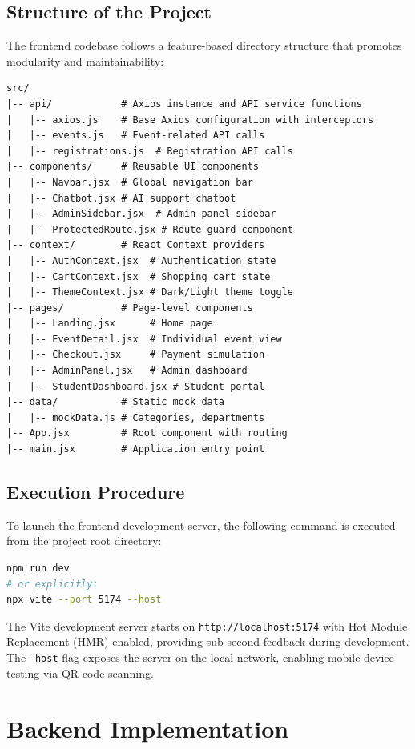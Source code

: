 \subsection{Structure of the Project}
The frontend codebase follows a feature-based directory structure that promotes modularity and maintainability:

\begin{lstlisting}[caption={Frontend Directory Structure}]
src/
|-- api/            # Axios instance and API service functions
|   |-- axios.js    # Base Axios configuration with interceptors
|   |-- events.js   # Event-related API calls
|   |-- registrations.js  # Registration API calls
|-- components/     # Reusable UI components
|   |-- Navbar.jsx  # Global navigation bar
|   |-- Chatbot.jsx # AI support chatbot
|   |-- AdminSidebar.jsx  # Admin panel sidebar
|   |-- ProtectedRoute.jsx # Route guard component
|-- context/        # React Context providers
|   |-- AuthContext.jsx  # Authentication state
|   |-- CartContext.jsx  # Shopping cart state
|   |-- ThemeContext.jsx # Dark/Light theme toggle
|-- pages/          # Page-level components
|   |-- Landing.jsx      # Home page
|   |-- EventDetail.jsx  # Individual event view
|   |-- Checkout.jsx     # Payment simulation
|   |-- AdminPanel.jsx   # Admin dashboard
|   |-- StudentDashboard.jsx # Student portal
|-- data/           # Static mock data
|   |-- mockData.js # Categories, departments
|-- App.jsx         # Root component with routing
|-- main.jsx        # Application entry point
\end{lstlisting}

\subsection{Execution Procedure}
To launch the frontend development server, the following command is executed from the project root directory:

\begin{lstlisting}[language=bash, caption={Frontend Execution}]
npm run dev
# or explicitly:
npx vite --port 5174 --host
\end{lstlisting}

The Vite development server starts on \texttt{http://localhost:5174} with Hot Module Replacement (HMR) enabled, providing sub-second feedback during development. The \texttt{--host} flag exposes the server on the local network, enabling mobile device testing via QR code scanning.

\section{Backend Implementation}

